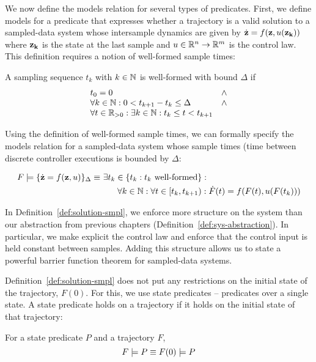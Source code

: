 We now define the models relation for several types of predicates. First,
we define models for a predicate that expresses whether a trajectory is a
valid solution to a sampled-data system whose intersample dynamics are
given by $\dot{\mathbf{z}} = f(\mathbf{z},u(\mathbf{z_k}))$ where
$\mathbf{z_k}$ is the state at the last sample and $u \in \mathbb{R}^n \rightarrow
\mathbb{R}^m$ is the control law. This definition requires a notion of well-formed
sample times:
\begin{definition}
A sampling sequence $t_k$ with $k \in \mathbb{N}$ is well-formed with bound $\Delta$ if
\[\begin{array}{lr}
t_0 = 0 & \wedge \\
\forall k \in \mathbb{N} : 0 < t_{k + 1} - t_k \leq \Delta & \wedge \\
\forall t \in \mathbb{R}_{> 0} : \exists k \in \mathbb{N} : t_k \leq t < t_{k + 1}
\end{array}
\]
\end{definition}
Using the definition of well-formed sample times, we can formally specify
the models relation for a sampled-data system whose sample times (time
between discrete controller executions is bounded by $\Delta$:
\begin{definition}
\begin{align*}
F \models \{\dot{\mathbf{z}} = f(\mathbf{z},u)\}_{\Delta}
\equiv&~\exists t_k \in \{ t_k : t_k \text{ well-formed} \} : \\
&\qquad \forall k \in \mathbb{N} : \forall t \in [t_k,t_{k+1}) : \dot{F}(t) = f(F(t),u(F(t_k)))
\end{align*}
\label{def:solution-smpl}
\end{definition}
In Definition~\ref{def:solution-smpl}, we enforce more structure on the
system than our \SysA{} abstraction from previous chapters
(Definition~\ref{def:sys-abstraction}). In particular, we make explicit the
control law and enforce that the control input is held constant between
samples. Adding this structure allows us to state a powerful barrier
function theorem for sampled-data systems.

Definition~\ref{def:solution-smpl} does not put any restrictions on the
initial state of the trajectory, $F(0)$. For this, we use state
predicates -- predicates over a single state. A state predicate holds on
a trajectory if it holds on the initial state of that trajectory:
\begin{definition}[Initially]
For a state predicate $P$ and a trajectory $F$,
\[
F \models P \equiv F(0) \models P
\]
\label{def:init}
\end{definition}

